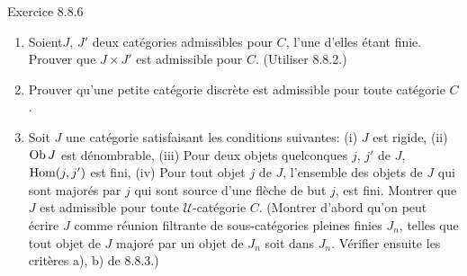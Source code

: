 \documentclass[10pt]{../fichiers-configuration-latex/smfart}
\def\labelenumi{(\theenumi)}
\begin{document}
\begin{enonce*}[remark]{Exercice 8.8.6}
\begin{enumerate}
\renewcommand{\theenumi}{\alph{enumi}}
\renewcommand{\labelenumi}{\theenumi)}
\item Soient\pageoriginale $J$, $J'$ deux catégories admissibles
pour $C$, l'une d'elles étant finie. Prouver que $J\times J'$ est
admissible pour $C$. (Utiliser 8.8.2.)

\item Prouver qu'une petite catégorie discrète est admissible pour
toute catégorie $C$.

\item Soit $J$ une catégorie satisfaisant les conditions suivantes:
(i) $J$ est rigide, (ii) $\operatorname{Ob} J$ est dénombrable, (iii) Pour deux
objets quelconques $j$, $j'$ de $J$, $\operatorname{Hom}(j,j')$ est fini, (iv)
Pour tout objet $j$ de $J$, l'ensemble des objets de $J$ qui sont
majorés par $j$ \ie qui sont source d'une flèche de but $j$, est
fini. Montrer que $J$ est admissible pour toute
$𝒰$-catégorie $C$. (Montrer d'abord qu'on peut écrire $J$
comme réunion filtrante de sous-catégories pleines finies $J_n$,
telles que tout objet de $J$ majoré par un objet de $J_n$ soit dans
$J_n$. Vérifier ensuite les critères a), b) de 8.8.3.)
\end{enumerate}
\end{enonce*}
\end{document}
